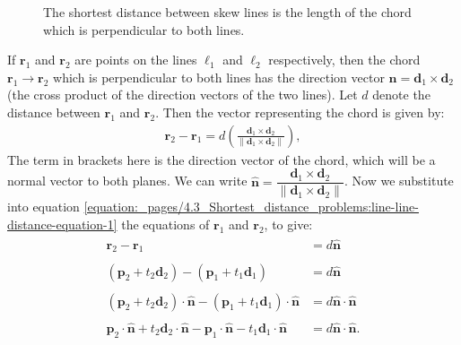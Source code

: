 \documentclass[letterpaper,10pt,english]{jupyterBook}
\let\sphinxpxdimen\pdfpxdimen\else\newdimen\sphinxpxdimen
\begin{document}
\begin{figure}[htbp]
\centering
\capstart

\noindent\sphinxincludegraphics[width=350\sphinxpxdimen]{{4_line_line_distance}.svg}
\caption{The shortest distance between skew lines is the length of the chord which is perpendicular to both lines.}\label{\detokenize{_pages/4.3_Shortest_distance_problems:line-line-distance-figure}}\end{figure}

\sphinxAtStartPar
If \(\mathbf{r}_1\) and \(\mathbf{r}_2\) are points on the lines \(\ell_1\) and \(\ell_2\) respectively, then the chord \(\mathbf{r}_1 \to  \mathbf{r}_2\) which is perpendicular to both lines has the direction vector \(\mathbf{n} = \mathbf{d}_1 \times \mathbf{d}_2\) (the cross product of the direction vectors of the two lines). Let \(d\) denote the distance between \(\mathbf{r}_1\) and \(\mathbf{r}_2\). Then the vector representing the chord is given by:
\begin{equation}\label{equation:_pages/4.3_Shortest_distance_problems:line-line-distance-equation-1}
\begin{split} \mathbf{r}_2 - \mathbf{r}_1 = d \left( \frac{\mathbf{d}_1 \times \mathbf{d}_2}{\| \mathbf{d}_1 \times \mathbf{d}_2\|} \right), \end{split}
\end{equation}
\sphinxAtStartPar
The term in brackets here is the direction vector of the chord, which will be a normal vector to both planes. We can write \(\hat{\mathbf{n}} = \dfrac{\mathbf{d}_1 \times \mathbf{d}_2}{\|\mathbf{d}_1 \times \mathbf{d}_2\|}\). Now we substitute into  equation \eqref{equation:_pages/4.3_Shortest_distance_problems:line-line-distance-equation-1} the equations of \(\mathbf{r}_1\) and \(\mathbf{r}_2\), to give:
\begin{equation*}
\begin{split} \begin{align*}
    \mathbf{r}_2 - \mathbf{r}_1 &= d \hat{\mathbf{n}}\\ \\
    (\mathbf{p}_2 + t_2 \mathbf{d}_2) - (\mathbf{p}_1 + t_1 \mathbf{d}_1)
    &= d \hat{\mathbf{n}}\\ \\
    (\mathbf{p}_2 + t_2 \mathbf{d}_2) \cdot \hat{\mathbf{n}} - (\mathbf{p}_1 + t_1 \mathbf{d}_1) \cdot \hat{\mathbf{n}}
    &= d \hat{\mathbf{n}} \cdot \hat{\mathbf{n}} \\ \\
    \mathbf{p}_2 \cdot \hat{\mathbf{n}} + t_2 \mathbf{d}_2 \cdot \hat{\mathbf{n}} - \mathbf{p}_1 \cdot \hat{\mathbf{n}} - t_1 \mathbf{d}_1 \cdot \hat{\mathbf{n}}
    &= d \hat{\mathbf{n}} \cdot \hat{\mathbf{n}}.
\end{align*} \end{split}
\end{equation*}
\end{document}
